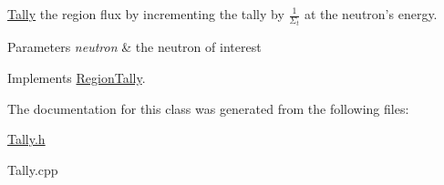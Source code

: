 \hyperlink{classTally}{Tally} the region flux by incrementing the tally by $ \frac{1}{\Sigma_t} $ at the neutron's energy. 


\begin{DoxyParams}{Parameters}
{\em neutron} & the neutron of interest \\
\hline
\end{DoxyParams}


Implements \hyperlink{classRegionTally_ae146fd937e34306fdd5cc4aac44a3856}{Region\-Tally}.



The documentation for this class was generated from the following files\-:\begin{DoxyCompactItemize}
\item 
\hyperlink{Tally_8h}{Tally.\-h}\item 
Tally.\-cpp\end{DoxyCompactItemize}
